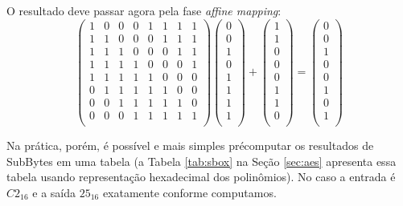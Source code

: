 \begin{example}
O resultado deve passar agora pela fase {\em affine mapping}:
\begin{displaymath}
\left(\begin{array}{cccccccc}
1 & 0 & 0 & 0 & 1 & 1 & 1 & 1 \\
1 & 1 & 0 & 0 & 0 & 1 & 1 & 1 \\
1 & 1 & 1 & 0 & 0 & 0 & 1 & 1 \\
1 & 1 & 1 & 1 & 0 & 0 & 0 & 1 \\
1 & 1 & 1 & 1 & 1 & 0 & 0 & 0 \\
0 & 1 & 1 & 1 & 1 & 1 & 0 & 0 \\
0 & 0 & 1 & 1 & 1 & 1 & 1 & 0 \\
0 & 0 & 0 & 1 & 1 & 1 & 1 & 1 \\\end{array} \right) 
\left( \begin{array}{c}
0\\ 0\\ 1\\ 0\\ 1\\ 1\\ 1\\ 1\\\end{array} \right)
+
\left( \begin{array}{c}
1\\ 1\\ 0\\ 0\\ 0\\ 1\\ 1\\ 0\\\end{array} \right)
=
\left( \begin{array}{c}
0\\ 0\\ 1\\ 0\\ 0\\ 1\\ 0\\ 1\\\end{array} \right)
\end{displaymath}

Na prática, porém, é possível e mais simples précomputar os resultados de SubBytes em uma tabela (a Tabela \ref{tab:sbox} na Seção \ref{sec:aes} apresenta essa tabela usando representação hexadecimal dos polinômios).
No caso a entrada é $C2_{16}$ e a saída $25_{16}$ exatamente conforme computamos.
\end{example}


